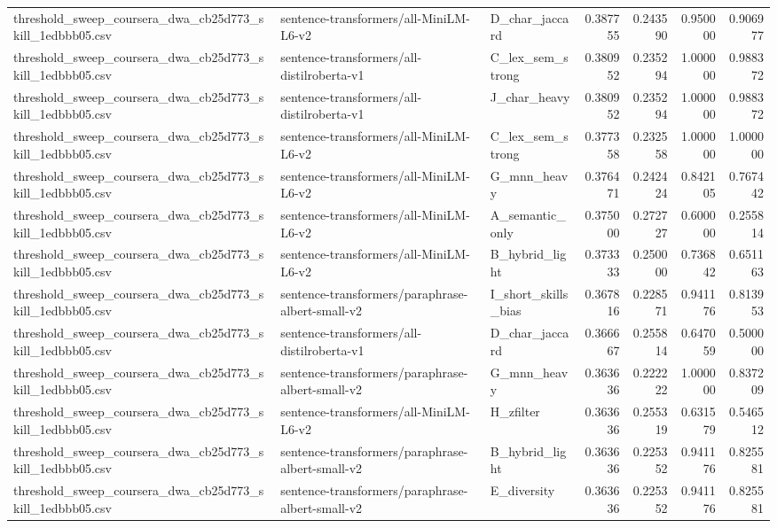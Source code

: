 \begin{table}[!ht]
\begin{tabular}{lllrrrr}
threshold\_sweep\_coursera\_dwa\_cb25d773\_skill\_1edbbb05.csv & sentence-transformers/all-MiniLM-L6-v2 & D\_char\_jaccard & 0.387755 & 0.243590 & 0.950000 & 0.906977 \\
threshold\_sweep\_coursera\_dwa\_cb25d773\_skill\_1edbbb05.csv & sentence-transformers/all-distilroberta-v1 & C\_lex\_sem\_strong & 0.380952 & 0.235294 & 1.000000 & 0.988372 \\
threshold\_sweep\_coursera\_dwa\_cb25d773\_skill\_1edbbb05.csv & sentence-transformers/all-distilroberta-v1 & J\_char\_heavy & 0.380952 & 0.235294 & 1.000000 & 0.988372 \\
threshold\_sweep\_coursera\_dwa\_cb25d773\_skill\_1edbbb05.csv & sentence-transformers/all-MiniLM-L6-v2 & C\_lex\_sem\_strong & 0.377358 & 0.232558 & 1.000000 & 1.000000 \\
threshold\_sweep\_coursera\_dwa\_cb25d773\_skill\_1edbbb05.csv & sentence-transformers/all-MiniLM-L6-v2 & G\_mnn\_heavy & 0.376471 & 0.242424 & 0.842105 & 0.767442 \\
threshold\_sweep\_coursera\_dwa\_cb25d773\_skill\_1edbbb05.csv & sentence-transformers/all-MiniLM-L6-v2 & A\_semantic\_only & 0.375000 & 0.272727 & 0.600000 & 0.255814 \\
threshold\_sweep\_coursera\_dwa\_cb25d773\_skill\_1edbbb05.csv & sentence-transformers/all-MiniLM-L6-v2 & B\_hybrid\_light & 0.373333 & 0.250000 & 0.736842 & 0.651163 \\
threshold\_sweep\_coursera\_dwa\_cb25d773\_skill\_1edbbb05.csv & sentence-transformers/paraphrase-albert-small-v2 & I\_short\_skills\_bias & 0.367816 & 0.228571 & 0.941176 & 0.813953 \\
threshold\_sweep\_coursera\_dwa\_cb25d773\_skill\_1edbbb05.csv & sentence-transformers/all-distilroberta-v1 & D\_char\_jaccard & 0.366667 & 0.255814 & 0.647059 & 0.500000 \\
threshold\_sweep\_coursera\_dwa\_cb25d773\_skill\_1edbbb05.csv & sentence-transformers/paraphrase-albert-small-v2 & G\_mnn\_heavy & 0.363636 & 0.222222 & 1.000000 & 0.837209 \\
threshold\_sweep\_coursera\_dwa\_cb25d773\_skill\_1edbbb05.csv & sentence-transformers/all-MiniLM-L6-v2 & H\_zfilter & 0.363636 & 0.255319 & 0.631579 & 0.546512 \\
threshold\_sweep\_coursera\_dwa\_cb25d773\_skill\_1edbbb05.csv & sentence-transformers/paraphrase-albert-small-v2 & B\_hybrid\_light & 0.363636 & 0.225352 & 0.941176 & 0.825581 \\
threshold\_sweep\_coursera\_dwa\_cb25d773\_skill\_1edbbb05.csv & sentence-transformers/paraphrase-albert-small-v2 & E\_diversity & 0.363636 & 0.225352 & 0.941176 & 0.825581 \\

\end{tabular}
\end{table}
